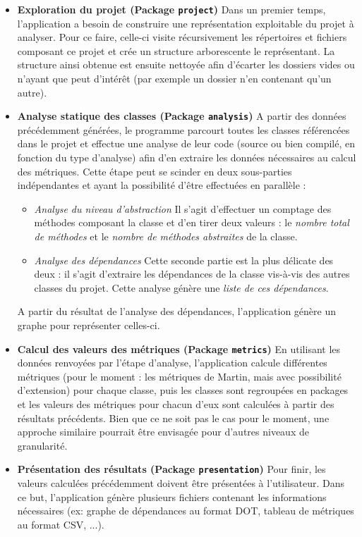\documentclass{scrartcl}
\begin{document}
    \begin{itemize}
        \bigbreak 
        \item[] \textbf{Exploration du projet (Package \texttt{project})} Dans un premier temps, l'application a besoin de construire une représentation exploitable du projet à analyser. Pour ce faire, celle-ci visite récursivement les répertoires et fichiers composant ce projet et crée un structure arborescente le représentant. La structure ainsi obtenue est ensuite nettoyée afin d'écarter les dossiers vides ou n'ayant que peut d'intérêt (par exemple un dossier n'en contenant qu'un autre).

        \bigbreak 
        \item[] \textbf{Analyse statique des classes (Package \texttt{analysis})} A partir des données précédemment générées, le programme parcourt toutes les classes référencées dans le projet et effectue une analyse de leur code (source ou bien compilé, en fonction du type d'analyse) afin d'en extraire les données nécessaires au calcul des métriques. Cette étape peut se scinder en deux sous-parties indépendantes et ayant la possibilité d'être effectuées en parallèle :
        \begin{itemize}
            \item \textit{Analyse du niveau d'abstraction} Il s'agit d'effectuer un comptage des méthodes composant la classe et d'en tirer deux valeurs : le \emph{nombre total de méthodes} et le \emph{nombre de méthodes abstraites} de la classe.
            \item \textit{Analyse des dépendances} Cette seconde partie est la plus délicate des deux : il s'agit d'extraire les dépendances de la classe vis-à-vis des autres classes du projet. Cette analyse génère une \emph{liste de ces dépendances}.
        \end{itemize}
        A partir du résultat de l'analyse des dépendances, l'application génère un graphe pour représenter celles-ci.
    
        \bigbreak 
        \item[] \textbf{Calcul des valeurs des métriques (Package \texttt{metrics})} En utilisant les données renvoyées par l'étape d'analyse, l'application calcule différentes métriques (pour le moment : les métriques de Martin, mais avec possibilité d'extension) pour chaque classe, puis les classes sont regroupées en packages et les valeurs des métriques pour chacun d'eux sont calculées à partir des résultats précédents. Bien que ce ne soit pas le cas pour le moment, une approche similaire pourrait être envisagée pour d'autres niveaux de granularité.
    
        \bigbreak 
        \item[] \textbf{Présentation des résultats (Package \texttt{presentation})} Pour finir, les valeurs calculées précédemment doivent être présentées à l'utilisateur. Dans ce but, l'application génère plusieurs fichiers contenant les informations nécessaires (ex: graphe de dépendances au format DOT, tableau de métriques au format CSV, ...).
    
    \end{itemize}
\end{document}
